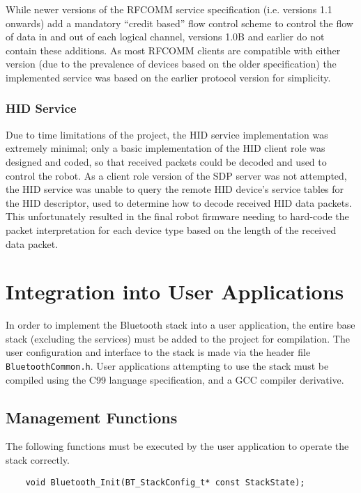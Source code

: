While newer versions of the RFCOMM service specification (i.e. versions 1.1 onwards) add a mandatory ``credit based'' flow control scheme to control the flow of data in and out of each logical channel, versions 1.0B and earlier do not contain these additions. As most RFCOMM clients are compatible with either version (due to the prevalence of devices based on the older specification) the implemented service was based on the earlier protocol version for simplicity.

\FloatBarrier
\subsubsection{HID Service}

Due to time limitations of the project, the HID service implementation was extremely minimal; only a basic implementation of the HID client role was designed and coded, so that received packets could be decoded and used to control the robot. As a client role version of the SDP server was not attempted, the HID service was unable to query the remote HID device's service tables for the HID descriptor, used to determine how to decode received HID data packets. This unfortunately resulted in the final robot firmware needing to hard-code the packet interpretation for each device type based on the length of the received data packet.

\section{Integration into User Applications}

In order to implement the Bluetooth stack into a user application, the entire base stack (excluding the services) must be added to the project for compilation. The user configuration and interface to the stack is made via the header file \texttt{BluetoothCommon.h}. User applications attempting to use the stack must be compiled using the C99 language specification, and a GCC compiler derivative.

\FloatBarrier
\subsection{Management Functions}

The following functions must be executed by the user application to operate the stack correctly.

\vspace{1em}
\begin{lstlisting}
	void Bluetooth_Init(BT_StackConfig_t* const StackState);
\end{lstlisting}

